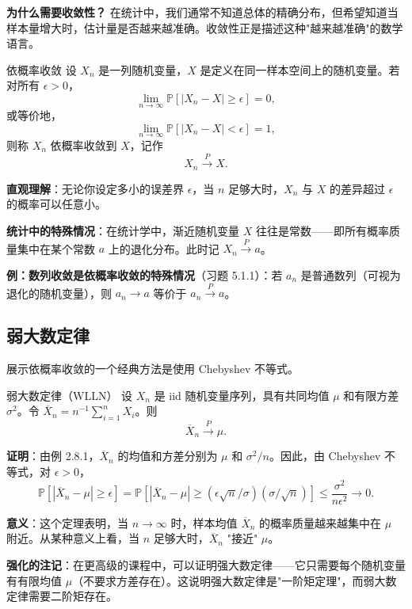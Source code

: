 \textbf{为什么需要收敛性？} 在统计中，我们通常不知道总体的精确分布，但希望知道当样本量增大时，估计量是否越来越准确。收敛性正是描述这种"越来越准确"的数学语言。

\begin{definition}{依概率收敛}\label{def:convergence-in-probability}
设 ${X_n}$ 是一列随机变量，$X$ 是定义在同一样本空间上的随机变量。若对所有 $\epsilon > 0$，
\[
\lim_{n \to \infty} \mathbb{P}[|X_n - X| \geq \epsilon] = 0,
\]
或等价地，
\[
\lim_{n \to \infty} \mathbb{P}[|X_n - X| < \epsilon] = 1,
\]
则称 $X_n$ 依概率收敛到 $X$，记作
\[
X_n \xrightarrow{P} X.
\]
\end{definition}

\textbf{直观理解}：无论你设定多小的误差界 $\epsilon$，当 $n$ 足够大时，$X_n$ 与 $X$ 的差异超过 $\epsilon$ 的概率可以任意小。

\textbf{统计中的特殊情况}：在统计学中，渐近随机变量 $X$ 往往是常数——即所有概率质量集中在某个常数 $a$ 上的退化分布。此时记 $X_n \xrightarrow{P} a$。

\textbf{例：数列收敛是依概率收敛的特殊情况}（习题 5.1.1）：若 ${a_n}$ 是普通数列（可视为退化的随机变量），则 $a_n \to a$ 等价于 $a_n \xrightarrow{P} a$。

\subsection{弱大数定律}

展示依概率收敛的一个经典方法是使用 Chebyshev 不等式。

\begin{example}{弱大数定律（WLLN）}\label{ex:wlln}
设 ${X_n}$ 是 iid 随机变量序列，具有共同均值 $\mu$ 和有限方差 $\sigma^2$。令 $\overline{X}_n = n^{-1}\sum_{i=1}^n X_i$。则
\[
\overline{X}_n \xrightarrow{P} \mu.
\]

\textbf{证明}：由例 2.8.1，$\overline{X}_n$ 的均值和方差分别为 $\mu$ 和 $\sigma^2/n$。因此，由 Chebyshev 不等式，对 $\epsilon > 0$，
\[
\mathbb{P}[|\overline{X}_n - \mu| \geq \epsilon] = \mathbb{P}[|\overline{X}_n - \mu| \geq (\epsilon\sqrt{n}/\sigma)(\sigma/\sqrt{n})] \leq \frac{\sigma^2}{n\epsilon^2} \to 0.
\label{eq:wlln-proof}
\]

\textbf{意义}：这个定理表明，当 $n \to \infty$ 时，样本均值 $\overline{X}_n$ 的概率质量越来越集中在 $\mu$ 附近。从某种意义上看，当 $n$ 足够大时，$\overline{X}_n$ "接近" $\mu$。%

\textbf{强化的注记}：在更高级的课程中，可以证明强大数定律——它只需要每个随机变量有有限均值 $\mu$（不要求方差存在）。这说明强大数定律是"一阶矩定理"，而弱大数定律需要二阶矩存在。
\end{example}

